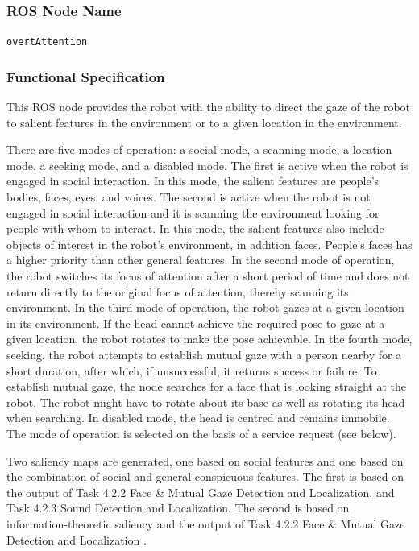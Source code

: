 \documentclass{CSSRforAfrica}
\begin{document}
{{\subsubsection*{ROS Node Name}
 {\normalsize \verb+overtAttention+}   

\subsubsection*{Functional Specification}
This ROS node   provides the robot with the ability to direct the gaze of the robot  to salient features in the environment or to a given location in the environment. 

There are five modes of operation: a social mode, a scanning mode, a location mode, a seeking mode, and a disabled mode. The first is active when the robot is engaged in social interaction.  In this mode, the salient features are people's bodies, faces, eyes, and voices.  The second is active when the robot is not engaged in social interaction and it  is scanning the environment looking for people with whom to interact.  In this mode, the salient features also include objects of interest in the robot's environment, in addition faces. People's faces has a higher priority than other general features.  In the second mode of operation, the robot  switches its focus of attention after a short period of time and  does not return directly to the original focus of attention, thereby scanning its environment. In the third mode of operation, the robot gazes at a given location in its environment. If the head cannot achieve the required pose to gaze at a given location, the robot  rotates to make the pose achievable. In the fourth mode, seeking, the robot attempts to establish mutual gaze with a person nearby for a short duration, after which, if unsuccessful, it returns success or failure. To establish mutual gaze, the node searches for a face that is looking straight at the robot.  The robot might have to rotate about its base as well as rotating its head when searching. In disabled mode, the head is centred and remains immobile. The mode of operation is selected on the basis of a service request (see below).

Two saliency maps are  generated, one based on social features and one based on the combination of social and general conspicuous features. The first is based on  the output of  Task 4.2.2 Face \& Mutual Gaze Detection and Localization, and Task 4.2.3 Sound Detection and Localization. The second  is based on   information-theoretic saliency  and the output of Task 4.2.2 Face \& Mutual Gaze Detection and Localization \cite{BruceTsotsos09}. 

}}
\end{document}
